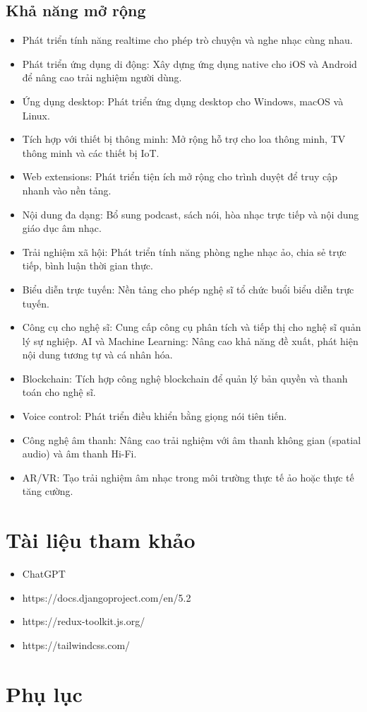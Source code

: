 \documentclass[a4paper,12pt]{article}
\begin{document}
\subsection{Khả năng mở rộng}
\begin{itemize}
    \item Phát triển tính năng realtime cho phép trò chuyện và nghe nhạc cùng nhau.
    \item Phát triển ứng dụng di động: Xây dựng ứng dụng native cho iOS và Android để nâng cao trải nghiệm người dùng.
    \item Ứng dụng desktop: Phát triển ứng dụng desktop cho Windows, macOS và Linux.
    \item Tích hợp với thiết bị thông minh: Mở rộng hỗ trợ cho loa thông minh, TV thông minh và các thiết bị IoT.
    \item Web extensions: Phát triển tiện ích mở rộng cho trình duyệt để truy cập nhanh vào nền tảng.
    \item Nội dung đa dạng: Bổ sung podcast, sách nói, hòa nhạc trực tiếp và nội dung giáo dục âm nhạc.
    \item  Trải nghiệm xã hội: Phát triển tính năng phòng nghe nhạc ảo, chia sẻ trực tiếp, bình luận thời gian thực.
    \item Biểu diễn trực tuyến: Nền tảng cho phép nghệ sĩ tổ chức buổi biểu diễn trực tuyến.
    \item Công cụ cho nghệ sĩ: Cung cấp công cụ phân tích và tiếp thị cho nghệ sĩ quản lý sự nghiệp.
    AI và Machine Learning: Nâng cao khả năng đề xuất, phát hiện nội dung tương tự và cá nhân hóa.
    \item Blockchain: Tích hợp công nghệ blockchain để quản lý bản quyền và thanh toán cho nghệ sĩ.
    \item Voice control: Phát triển điều khiển bằng giọng nói tiên tiến.
    \item Công nghệ âm thanh: Nâng cao trải nghiệm với âm thanh không gian (spatial audio) và âm thanh Hi-Fi.
    \item AR/VR: Tạo trải nghiệm âm nhạc trong môi trường thực tế ảo hoặc thực tế tăng cường.
\end{itemize}
\newpage
\section*{Tài liệu tham khảo}
\begin{itemize}
    \item ChatGPT 
    \item https://docs.djangoproject.com/en/5.2 
    \item https://redux-toolkit.js.org/
    \item https://tailwindcss.com/
\end{itemize}

\newpage
\section*{Phụ lục}
\end{document}
